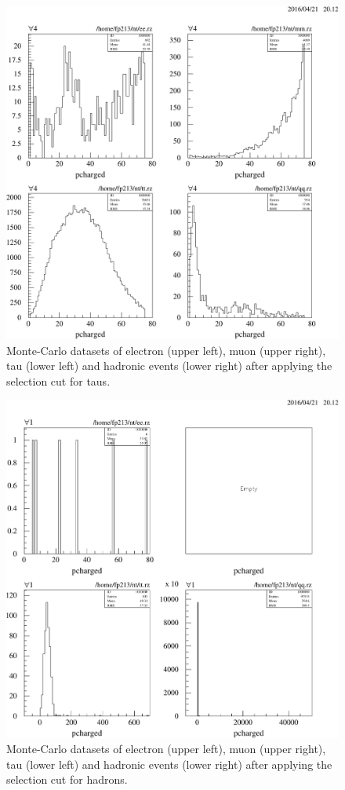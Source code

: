 \documentclass[11pt, a4paper]{article}
\numberwithin{equation}{section}
\begin{document}
\begin{appendix}
\begin{figure}[h]
	\centering
	\includegraphics[width=1\textwidth]{./data/tag2/final_cuts/cropped/tau_cut.pdf}
	\caption{Monte-Carlo datasets of electron (upper left), muon (upper right), tau (lower left) and hadronic events (lower right) after applying the selection cut for taus.}
\end{figure}

\begin{figure}[h]
	\centering
	\includegraphics[width=1\textwidth]{./data/tag2/final_cuts/cropped/hadron_cut.pdf}
	\caption{Monte-Carlo datasets of electron (upper left), muon (upper right), tau (lower left) and hadronic events (lower right) after applying the selection cut for hadrons.}
\end{figure}


\end{appendix}
\end{document}
